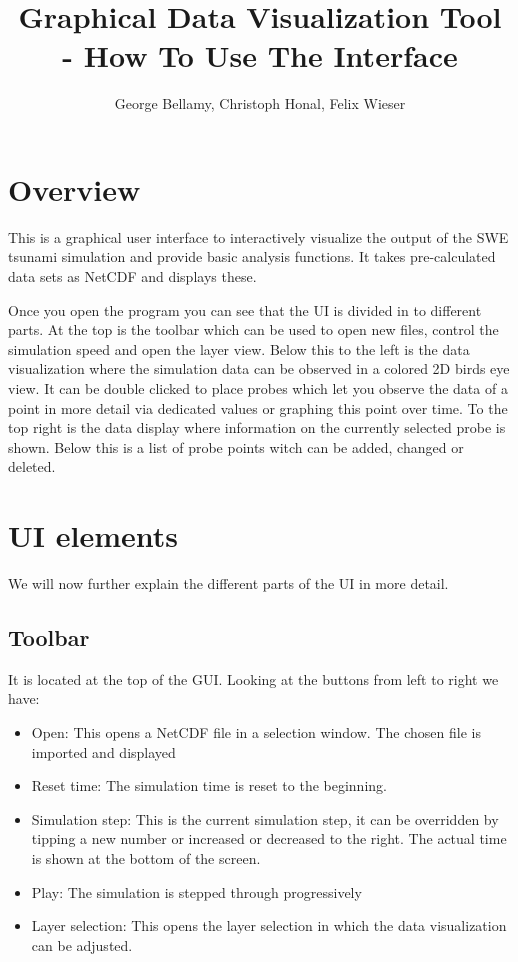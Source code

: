 \documentclass[paper=a4]{proc}
\title{Graphical Data Visualization Tool - How To Use The Interface}
\author{George Bellamy, Christoph Honal, Felix Wieser}
\begin{document}
	\maketitle
	\thispagestyle{plain}	%
	\section{Overview}
		This is a graphical user interface to interactively visualize the output of the SWE tsunami simulation and provide basic analysis functions. It takes pre-calculated data sets as NetCDF and displays these. 
		
Once you open the program you can see that the UI is divided in to different parts. At the top is the toolbar which can be used to open new files, control the simulation speed and open the layer view. Below this to the left is the data visualization where the simulation data can be observed in a colored 2D birds eye view. It can be double clicked to place probes which let you observe the data of a point in more detail via dedicated values or graphing this point over time.
To the top right is the data display where information on the currently selected probe is shown. Below this is a list of probe points witch can be added, changed or deleted.
		
	\section{UI elements}
	We will now further explain the different parts of the UI in more detail. 
	
		\subsection{Toolbar}
		It is located at the top of the GUI. Looking at the buttons from left to right we have:
		\begin{itemize}
		\item Open: This opens a NetCDF file in a selection window. The chosen file is imported and displayed
		\item Reset time: The simulation time is reset to the beginning.
		\item Simulation step: This is the current simulation step, it can be overridden by tipping a new number or increased or decreased to the right. The actual time is shown at the bottom of the screen.
		\item Play: The simulation is stepped through progressively
		\item Layer selection: This opens the layer selection in which the data visualization can be adjusted.
		\end{itemize}
		
\end{document}
